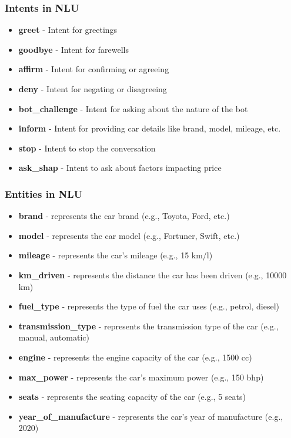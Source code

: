 \documentclass{beamer}
\begin{document}
\begin{frame}
	\frametitle{Intents in NLU}
	
	\begin{itemize}
		\item \textbf{greet} - Intent for greetings
		\item \textbf{goodbye} - Intent for farewells
		\item \textbf{affirm} - Intent for confirming or agreeing
		\item \textbf{deny} - Intent for negating or disagreeing
		\item \textbf{bot\_challenge} - Intent for asking about the nature of the bot
		\item \textbf{inform} - Intent for providing car details like brand, model, mileage, etc.
		\item \textbf{stop} - Intent to stop the conversation
		\item \textbf{ask\_shap} - Intent to ask about factors impacting price
	\end{itemize}
	
\end{frame}


\begin{frame}
	\frametitle{Entities in NLU}
	
	\begin{itemize}
		\item \textbf{brand} - represents the car brand (e.g., Toyota, Ford, etc.)
		\item \textbf{model} - represents the car model (e.g., Fortuner, Swift, etc.)
		\item \textbf{mileage} - represents the car's mileage (e.g., 15 km/l)
		\item \textbf{km\_driven} - represents the distance the car has been driven (e.g., 10000 km)
		\item \textbf{fuel\_type} - represents the type of fuel the car uses (e.g., petrol, diesel)
		\item \textbf{transmission\_type} - represents the transmission type of the car (e.g., manual, automatic)
		\item \textbf{engine} - represents the engine capacity of the car (e.g., 1500 cc)
		\item \textbf{max\_power} - represents the car's maximum power (e.g., 150 bhp)
		\item \textbf{seats} - represents the seating capacity of the car (e.g., 5 seats)
		\item \textbf{year\_of\_manufacture} - represents the car's year of manufacture (e.g., 2020)
	\end{itemize}
	
\end{frame}
\end{document}
